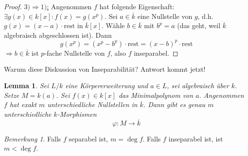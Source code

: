 \documentclass[a4paper,12pt,numbers=noenddot,parskip=full]{scrartcl}
\newcommand{\heading}{\underline}
\theoremstyle{dotless}
\newtheorem{lemma}[theorem]{Lemma}
\theoremstyle{remark}
\newtheorem*{remark}{Bemerkung}
\begin{document}
\begin{proof}
		\heading{$3) \Rightarrow 1)$:} Angenommen $f$ hat folgende Eigenschaft: $\exists g(x) \in k[x]: f(x) = g(x^p)$. Sei $a \in \overline{k}$ eine Nullstelle von $g$, d.h. $g(x) = (x - a) \cdot \text{rest}$ in $\overline{k}[x]$. Wähle $b \in \overline{k}$ mit $b^p = a$ (das geht, weil $\overline{k}$ algebraisch abgeschlossen ist). Dann
		\begin{equation*}
			g(x^p) = (x^p - b^p) \cdot \text{rest} = (x - b)^p \cdot \text{rest}
		\end{equation*}
		$\Rightarrow b \in \overline{k}$ ist $p$-fache Nullstelle von $f$, also $f$ inseparabel.
	\end{proof}

	Warum diese Diskussion von Inseparabilität? Antwort kommt jetzt!
	
	\begin{lemma}
		Sei $L/k$ eine Körpererweiterung und $a \in L$, sei algebraisch über $k$. Setze $M = k(a)$. Sei $f(x) \in k[x]$ das Minimalpolynom von $a$. Angenommen $f$ hat exakt $m$ unterschiedliche Nullstellen in $\overline{k}$. Dann gibt es genau $m$ unterschiedliche $k$-Morphismen
		\begin{equation*}
			\varphi: M \to \overline{k}
		\end{equation*}
	\end{lemma}

	\begin{remark}
		Falls $f$ separabel ist, $m = \deg f$. Falls $f$ inseparabel ist, ist $m < \deg f$.
	\end{remark}
\end{document}
